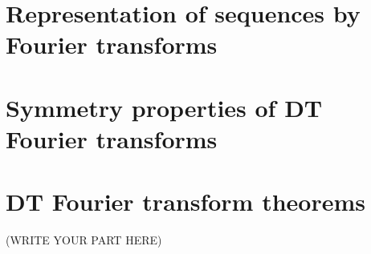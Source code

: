 \documentclass[10pt,a4paper,report]{report}       %
\begin{document}
\section{Representation of sequences by Fourier transforms}

\section{Symmetry properties of DT Fourier transforms}

\section{DT Fourier transform theorems}



\newpage
(WRITE YOUR PART HERE)\\



\end{document}
